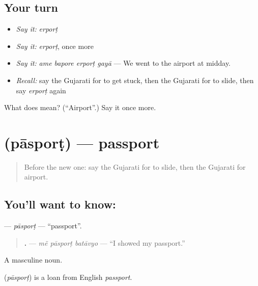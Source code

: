 \subsection*{Your turn}
\begin{itemize}
\raggedright
  \item \emph{Say it:} \emph{erporṭ}
  \item \emph{Say it:} \emph{erporṭ}, once more
  \item \emph{Say it:} \emph{ame bapore erporṭ gayā} — We went to the airport at midday.
  \item \emph{Recall:} say the Gujarati for to get stuck, then the Gujarati for to slide, then say \emph{erporṭ} again
\end{itemize}

\begin{tcolorbox}[breakable,colback=teal!4,colframe=teal!35!black,title={Before you move on}]
What does  mean? (\textquotedblleft{}Airport\textquotedblright{}.) Say it once more.
\end{tcolorbox}
\section[\texorpdfstring{\gu{પાસપોર્ટ} (pāsporṭ)}{પાસપોર્ટ (pāsporṭ)}]{ (pāsporṭ) — passport}

\label{lesson:GU-C210-pasport}



\begin{quote}
Before the new one: say the Gujarati for to slide, then the Gujarati for airport.
\end{quote}

\subsection*{You'll want to know: }
\textbf{} — \emph{pāsporṭ} — \textquotedblleft{}passport\textquotedblright{}.

\begin{quote}
\textbf{  .} — \emph{mẽ pāsporṭ batāvyo} — \textquotedblleft{}I showed my passport.\textquotedblright{}
\end{quote}

A masculine noun.

\begin{cousinweb}
\textbf{} (\emph{pāsporṭ}) is a loan from English \emph{passport}.
\end{cousinweb}

